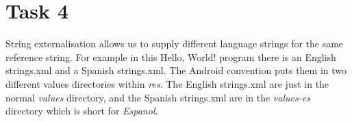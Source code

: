 \documentclass[11pt,english,numbers=endperiod,parskip=half]{scrartcl}
\begin{document}
\section{Task 4}
\raggedright
String externalisation allows us to supply different language strings for the same reference string. For example in this Hello, World! program there is an English strings.xml and a Spanish strings.xml. The Android convention puts them in two different values directories within \textit{res}. The English strings.xml are just in the normal \textit{values} directory, and the Spanish strings.xml are in the \textit{values-es} directory which is short for \textit{Espanol}.

\bigskip
{}\\
\bigskip
{}\\
\bigskip
{}\\
\end{document}
